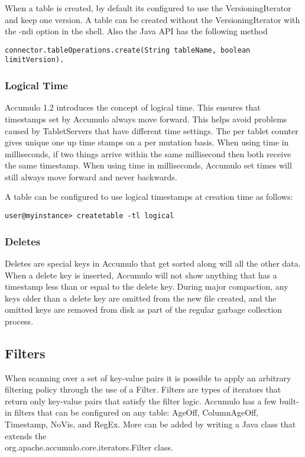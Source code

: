 When a table is created, by default its configured to use the
VersioningIterator and keep one version. A table can be created without the
VersioningIterator with the -ndi option in the shell. Also the Java API
has the following method 

\begingroup\fontsize{8pt}{8pt}\selectfont\begin{verbatim}
connector.tableOperations.create(String tableName, boolean limitVersion).
\end{verbatim}\endgroup


\subsubsection{Logical Time}

Accumulo 1.2 introduces the concept of logical time. This ensures that timestamps
set by Accumulo always move forward. This helps avoid problems caused by
TabletServers that have different time settings. The per tablet counter gives unique
one up time stamps on a per mutation basis. When using time in milliseconds, if
two things arrive within the same millisecond then both receive the same
timestamp. When using time in milliseconds, Accumulo set times will still
always move forward and never backwards.

A table can be configured to use logical timestamps at creation time as follows:

\begingroup\fontsize{8pt}{8pt}\selectfont\begin{verbatim}
user@myinstance> createtable -tl logical
\end{verbatim}\endgroup

\subsubsection{Deletes}
Deletes are special keys in Accumulo that get sorted along will all the other data.
When a delete key is inserted, Accumulo will not show anything that has a
timestamp less than or equal to the delete key. During major compaction, any keys
older than a delete key are omitted from the new file created, and the omitted keys
are removed from disk as part of the regular garbage collection process.

\subsection{Filters}
When scanning over a set of key-value pairs it is possible to apply an arbitrary
filtering policy through the use of a Filter. Filters are types of iterators that return
only key-value pairs that satisfy the filter logic. Accumulo has a few built-in filters
that can be configured on any table: AgeOff, ColumnAgeOff, Timestamp, NoVis, and RegEx. More can be added
by writing a Java class that extends the\\
org.apache.accumulo.core.iterators.Filter class.


